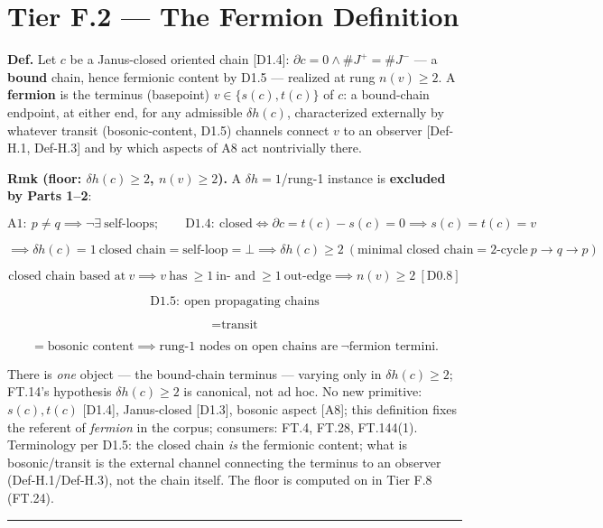 \section[Tier F.2 — The Fermion Definition]{\texorpdfstring{Tier F.2 — The Fermion Definition}{Tier F.2 - The Fermion Definition}}

\begin{definition}\label{tag:Def-H-4}
\textbf{Def.} Let $c$ be a Janus-closed oriented chain [D1.4]: $\partial c=0\wedge\#J^+=\#J^-$ — a \textbf{bound} chain, hence fermionic content by D1.5 — realized at rung $n(v)\ge2$. A \textbf{fermion} is the terminus (basepoint) $v\in\{s(c),t(c)\}$ of $c$: a bound-chain endpoint, at either end, for any admissible $\delta h(c)$, characterized externally by whatever transit (bosonic-content, D1.5) channels connect $v$ to an observer [Def-H.1, Def-H.3] and by which aspects of A8 act nontrivially there.

\textbf{Rmk (floor: $\delta h(c)\ge2$, $n(v)\ge2$).} A $\delta h=1$/rung-1 instance is \textbf{excluded by Parts 1–2}:

\[
\mathrm{A1}:\ p\ne q\implies\neg\exists\ \text{self-loops};\qquad
\mathrm{D1.4}:\ \text{closed}\iff\partial c=t(c)-s(c)=0\implies s(c)=t(c)=v
\]

\[
\implies\delta h(c)=1\ \text{closed chain}=\text{self-loop}=\bot\implies\delta h(c)\ge2\ (\text{minimal closed chain}=\text{2-cycle}\ p\to q\to p)
\]

\[
\text{closed chain based at}\ v\implies v\ \text{has}\ \ge1\ \text{in- and}\ \ge1\ \text{out-edge}\implies n(v)\ge2\ [\mathrm{D0.8}]
\]

\[
\mathrm{D1.5}:\ \text{open propagating chains}
\]

\[
= \text{transit}
\]

\[
= \text{bosonic content}\implies\text{rung-1 nodes on open chains are}\ \neg\text{fermion termini}.
\]

There is \textit{one} object — the bound-chain terminus — varying only in $\delta h(c)\ge2$; FT.14's hypothesis $\delta h(c)\ge2$ is canonical, not ad hoc. No new primitive: $s(c),t(c)$ [D1.4], Janus-closed [D1.3], bosonic aspect [A8]; this definition fixes the referent of \textit{fermion} in the corpus; consumers: FT.4, FT.28, FT.144(1). Terminology per D1.5: the closed chain \textit{is} the fermionic content; what is bosonic/transit is the external channel connecting the terminus to an observer (Def-H.1/Def-H.3), not the chain itself. The floor is computed on in Tier F.8 (FT.24).

\vspace{2pt}\noindent\rule{\textwidth}{0.4pt}\vspace{2pt}

\end{definition}

